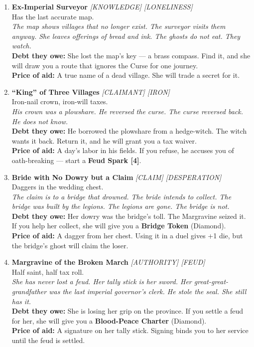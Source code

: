 \begin{enumerate}
\item \textbf{Ex-Imperial Surveyor} \hfill {} \textit{[KNOWLEDGE] [LONELINESS]} \\
  Has the last accurate map. \\
  \textit{The map shows villages that no longer exist. The surveyor visits them anyway. She leaves offerings of bread and ink. The ghosts do not eat. They watch.} \\
  \textbf{Debt they owe:} She lost the map's key --- a brass compass. Find it, and she will draw you a route that ignores the Curse for one journey. \\
  \textbf{Price of aid:} A true name of a dead village. She will trade a secret for it.

\item \textbf{``King'' of Three Villages} \hfill {} \textit{[CLAIMANT] [IRON]} \\
  Iron-nail crown, iron-will taxes. \\
  \textit{His crown was a plowshare. He reversed the curse. The curse reversed back. He does not know.} \\
  \textbf{Debt they owe:} He borrowed the plowshare from a hedge-witch. The witch wants it back. Return it, and he will grant you a tax waiver. \\
  \textbf{Price of aid:} A day's labor in his fields. If you refuse, he accuses you of oath-breaking --- start a \textbf{Feud Spark [4]}.

\item \textbf{Bride with No Dowry but a Claim} \hfill {} \textit{[CLAIM] [DESPERATION]} \\
  Daggers in the wedding chest. \\
  \textit{The claim is to a bridge that drowned. The bride intends to collect. The bridge was built by the legions. The legions are gone. The bridge is not.} \\
  \textbf{Debt they owe:} Her dowry was the bridge's toll. The Margravine seized it. If you help her collect, she will give you a \textbf{Bridge Token} (Diamond). \\
  \textbf{Price of aid:} A dagger from her chest. Using it in a duel gives +1 die, but the bridge's ghost will claim the loser.

\item \textbf{Margravine of the Broken March} \hfill {} \textit{[AUTHORITY] [FEUD]} \\
  Half saint, half tax roll. \\
  \textit{She has never lost a feud. Her tally stick is her sword. Her great-great-grandfather was the last imperial governor's clerk. He stole the seal. She still has it.} \\
  \textbf{Debt they owe:} She is losing her grip on the province. If you settle a feud for her, she will give you a \textbf{Blood-Peace Charter} (Diamond). \\
  \textbf{Price of aid:} A signature on her tally stick. Signing binds you to her service until the feud is settled.


\end{enumerate}
